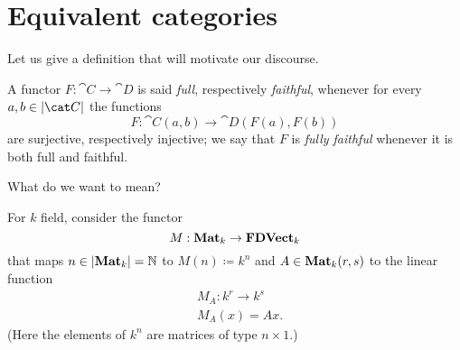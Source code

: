 
\section{Equivalent categories}

Let us give a definition that will motivate our discourse.

\begin{definition}
A functor \(F : \cat C \to \cat D\) is said {\em full}, respectively {\em faithful}, whenever for every \(a, b \in \obj{\cat C}\) the functions
\[F : \cat C (a, b) \to \cat D(F(a), F(b))\]
are surjective, respectively injective; we say that \(F\) is {\em fully faithful}  whenever it is both full and faithful.
\end{definition}

What do we want  to mean? 

\begin{example}\label{example:MatrixFunctor}
For \(k\) field, consider the functor
\[M : \mathbf{Mat}_k \to \mathbf{FDVect}_k\]
that maps \(n \in \left\lvert\mathbf{Mat}_k\right\rvert = \mathbb N\) to \(M(n) \coloneq k^n\) and \(A \in \mathbf{Mat}_k(r, s)\) to the linear function
\[\begin{aligned}
& M_A : k^r \to k^s \\
& M_A(x) = Ax .
\end{aligned}\]
(Here the elements of \(k^n\) are matrices of type \(n \times 1\).) \NotaInterna{\dots{}} %
\end{example}

